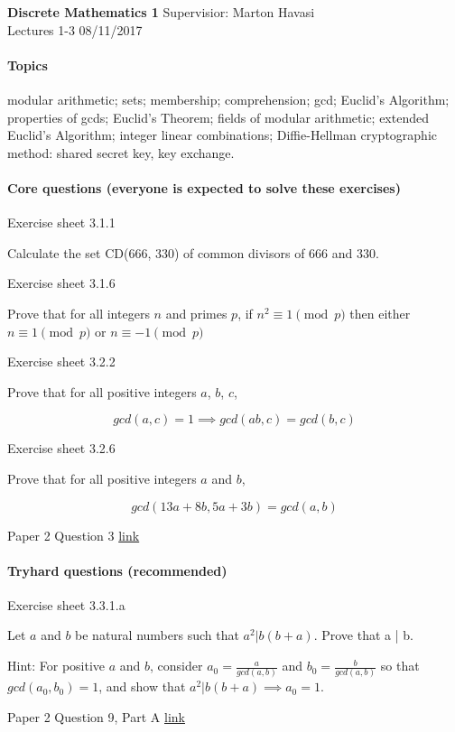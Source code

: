 \documentclass{exam}
\begin{document}
\noindent
\large\textbf{Discrete Mathematics 1} \hfill Supervisior: Marton Havasi \\
\normalsize Lectures 1-3 \hfill 08/11/2017
\paragraph{Topics}

modular arithmetic; sets; membership; comprehension; gcd; Euclid's Algorithm; properties of gcds; Euclid's Theorem; fields of modular arithmetic; extended Euclid's Algorithm; integer linear combinations; Diffie-Hellman cryptographic method: shared secret key, key exchange.

\paragraph{Core questions (everyone is expected to solve these exercises)}
\begin{questions}
\question Exercise sheet 3.1.1

Calculate the set CD(666, 330) of common divisors of 666 and 330.

\question Exercise sheet 3.1.6

 Prove that for all integers $n$ and primes $p$, if $n^2 \equiv 1 \pmod{p}$ then either $n \equiv 1 \pmod{p}$ or $n \equiv -1 \pmod{p}$
 
\question Exercise sheet 3.2.2

Prove that for all positive integers $a$, $b$, $c$,

$$gcd(a, c) = 1 \implies gcd(a  b, c) = gcd(b, c)$$

\question Exercise sheet 3.2.6

Prove that for all positive integers $a$ and $b$,

$$gcd(13a + 8b , 5a + 3b)=gcd(a, b)$$ 


 Paper 2 Question 3 \href{http://www.cl.cam.ac.uk/teaching/exams/pastpapers/y2007p2q3.pdf}{link}

\end{questions}

\paragraph{Tryhard questions (recommended)}
\begin{questions}
\question Exercise sheet 3.3.1.a

 Let $a$ and $b$ be natural numbers such that $a^2 | b(b + a)$. Prove that a | b.
 
Hint: For positive $a$ and $b$, consider $a_0 =\frac{a}{gcd(a,b)}$ and $b_0 = \frac{b}{gcd(a,b)}$ so that $gcd(a_0, b_0) = 1$, and show
that $a^2| b(b + a) \implies a_0 = 1$. 
 
  Paper 2 Question 9, Part A \href{http://www.cl.cam.ac.uk/teaching/exams/pastpapers/y2015p2q9.pdf}{link}

\end{questions}
\end{document}
